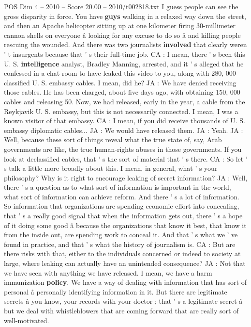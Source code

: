 \begin{textsample}{POS Dim 4 – 2010 – Score 20.00 – 2010/t002818.txt}
I guess people can see the gross disparity in force.
You have \textbf{guys} walking in a relaxed way down the street, and then an Apache helicopter sitting up at one kilometer firing 30-millimeter cannon shells on everyone â looking for any excuse to do so â and killing people rescuing the wounded.
And there was two journalists \textbf{involved} that clearly weren ' t insurgents because that ' s their full-time job.
CA : I mean, there ' s been this U.
S. \textbf{intelligence} analyst, Bradley Manning, arrested, and it ' s alleged that he confessed in a chat room to have leaked this video to you, along with 280, 000 classified U.
S. embassy cables.
I mean, did he?
JA : We have denied receiving those cables.
He has been charged, about five days ago, with obtaining 150, 000 cables and releasing 50.
Now, we had released, early in the year, a cable from the Reykjavik U.
S. embassy, but this is not necessarily connected.
I mean, I was a known visitor of that embassy.
CA : I mean, if you did receive thousands of U.
S. embassy diplomatic cables...
JA : We would have released them.
JA : Yeah.
JA : Well, because these sort of things reveal what the true state of, say, Arab governments are like, the true human-rights abuses in those governments.
If you look at declassified cables, that ' s the sort of material that ' s there.
CA : So let ' s talk a little more broadly about this.
I mean, in general, what ' s your philosophy?
Why is it right to encourage leaking of secret information?
JA : Well, there ' s a question as to what sort of information is important in the world, what sort of information can achieve reform.
And there ' s a lot of information.
So information that organizations are spending economic effort into concealing, that ' s a really good signal that when the information gets out, there ' s a hope of it doing some good â because the organizations that know it best, that know it from the inside out, are spending work to conceal it.
And that ' s what we ' ve found in practice, and that ' s what the history of journalism is.
CA : But are there risks with that, either to the individuals concerned or indeed to society at large, where leaking can actually have an unintended consequence?
JA : Not that we have seen with anything we have released.
I mean, we have a harm immunization \textbf{policy}.
We have a way of dealing with information that has sort of personal â personally identifying information in it.
But there are legitimate secrets â you know, your records with your doctor ; that ' s a legitimate secret â but we deal with whistleblowers that are coming forward that are really sort of well-motivated.

\end{textsample}
